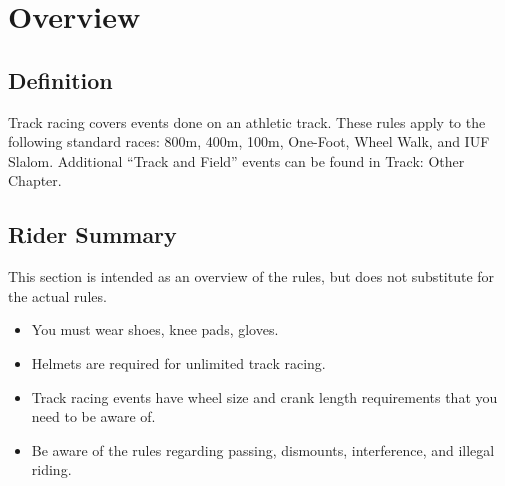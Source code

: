 \chapter{Overview}

\section{Definition}

Track racing covers events done on an athletic track. These rules apply to the following standard races: 800m, 400m, 100m, One-Foot, Wheel Walk, and IUF Slalom. Additional ``Track and Field'' events can be found in Track: Other Chapter.%

\section{Rider Summary}

This section is intended as an overview of the rules, but does not substitute for the actual rules.
\begin{itemize}
\item You must wear shoes, knee pads, gloves.
\item Helmets are required for unlimited track racing.
\item Track racing events have wheel size and crank length requirements that you need to be aware of.
\item Be aware of the rules regarding passing, dismounts, interference, and illegal riding.
\end{itemize}